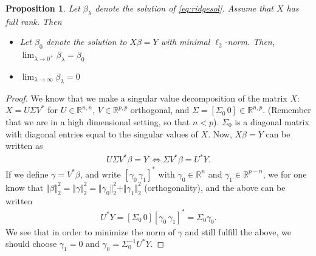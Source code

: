 \documentclass{article}
\newcommand{\R}{\mathbb{R}}
\newtheorem{prop}{Proposition}
\newcommand{\norm}[1]{\Vert #1 \Vert}
\begin{document}
\begin{prop}
    Let $\beta_\lambda$ denote the solution of \eqref{eq:ridgesol}. Assume that $X$ has full rank. Then
    \begin{itemize}
        \item  Let $\beta_0$ denote the solution to $X\beta =Y$ with minimal $\ell_2$-norm. Then, $\lim_{\lambda \to 0^+} \beta_\lambda=\beta_0$
        \item $\lim_{\lambda \to \infty} \beta_\lambda = 0$
    \end{itemize}
\end{prop}
\begin{proof} 

    We know that we make a singular value decomposition of the matrix $X$: $X = U\Sigma V^*$ for $U \in \R^{n,n}$, $V\in \R^{p,p}$ orthogonal, and $\Sigma = [\Sigma_0 \, 0]\in \R^{n,p}$. (Remember that we are in a high dimensional setting, so that $n<p$). $\Sigma_0$ is a diagonal matrix with diagonal entries equal to the singular values of $X$. Now, $X\beta = Y$ can be written as
    \begin{align*}
        U \Sigma V^*\beta = Y \, \Leftrightarrow \Sigma V^*\beta = U^*Y.
    \end{align*}
    If we define $\gamma = V^*\beta$, and write $[\gamma_0 \, \gamma_1]^*$ with $\gamma_0 \in \R^n$ and $\gamma_1 \in \R^{p-n}$, we for one know that $\norm{\beta}_2^2 = \norm{\gamma}_2^2 = \norm{\gamma_0}^2_2 + \norm{\gamma_1}_2^2$ (orthogonality), and the above can be written
    \begin{align*}
        U^*Y = [\Sigma_0 \, 0 ][\gamma_0 \, \gamma_1]^* = \Sigma_0 \gamma_0.
    \end{align*}
    We see that in order to minimize the norm of $\gamma$ and still fulfill the above, we should choose $\gamma_1=0$ and $\gamma_0 = \Sigma_0^{-1}U^*Y$.


\end{proof}
\end{document}
